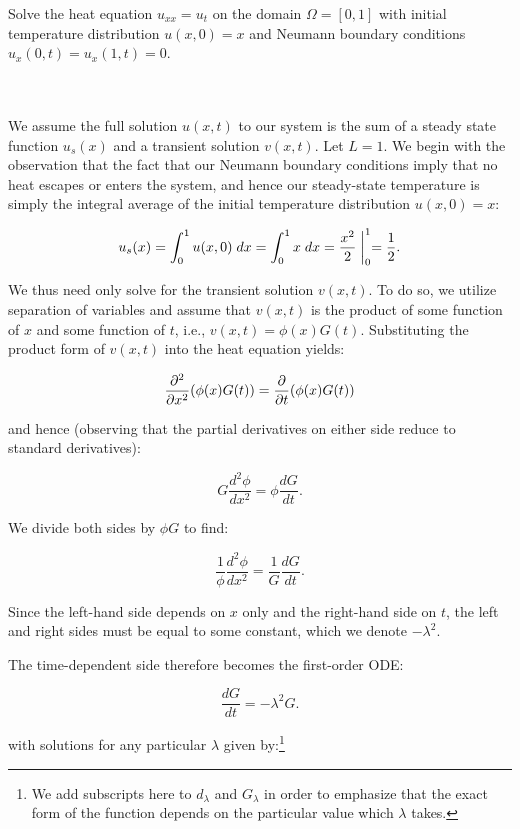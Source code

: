 Solve the heat equation $u_{xx} = u_t$ on the domain $\Omega = [0, 1]$ with initial temperature distribution 
$u(x, 0) = x$ and Neumann boundary conditions $u_x(0, t) = u_x(1, t) = 0$.

\begin{solution}\ \\\\
    We assume the full solution $u(x, t)$ to our system is the sum of a steady state function $u_s(x)$ and a transient 
    solution $v(x, t)$. Let $L = 1$. We begin with the observation that the fact that our Neumann boundary conditions 
    imply that no heat escapes or enters the system, and hence our steady-state temperature is simply the integral 
    average of the initial temperature distribution $u(x, 0) = x$:

    \begin{equation}
        u_s(x) = \int_0^1{u(x, 0)\; dx} = \int_0^1{x\; dx} = \frac{x^2}{2} \biggm\rvert_{0}^{1} = \frac{1}{2}.
    \end{equation}

    We thus need only solve for the transient solution $v(x, t)$.  To do so, we utilize separation of variables and 
    assume that $v(x, t)$ is the product of some function of $x$ and some function of $t$, i.e., 
    $v(x, t) = \phi(x) G(t)$. Substituting the product form of $v(x, t)$ into the heat equation yields:

    $$
    \frac{\partial^2}{\partial x^2} (\phi(x) G(t)) = \frac{\partial}{\partial t} (\phi(x) G(t)) \\
    $$

    and hence (observing that the partial derivatives on either side reduce to standard derivatives):

    $$
    G \frac{d^2 \phi}{d x^2} = \phi \frac{d G}{d t}.
    $$

    We divide both sides by $\phi G$ to find:

    $$
    \frac{1}{\phi} \frac{d^2 \phi}{d x^2} = \frac{1}{G} \frac{d G}{d t}.
    $$

    Since the left-hand side depends on $x$ only and the right-hand side on $t$, the left and right sides must be equal
    to some constant, which we denote $-\lambda^2$.

    The time-dependent side therefore becomes the first-order ODE:

    $$
    \frac{d G}{d t} = -\lambda^2 G.
    $$

    with solutions for any particular $\lambda$ given by:\footnote{
        We add subscripts here to $d_{\lambda}$ and $G_{\lambda}$ in order to emphasize that the exact form of the 
        function depends on the particular value which $\lambda$ takes.
    }


\end{solution}
